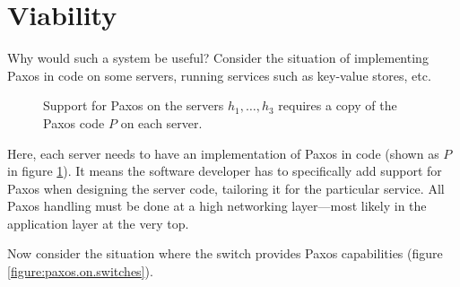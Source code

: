 \section{Viability}

Why would such a system be useful? Consider the situation of implementing
Paxos in code on some servers, running services such as key-value stores,
etc.

\begin{figure}[H]
  \centering
  \caption{Support for Paxos on the servers $h_1, \dots, h_3$ requires a
    copy of the Paxos code $P$ on each server.}
  \label{figure:paxos.on.servers}
\end{figure}

Here, each server needs to have an implementation of Paxos in code (shown as $P$
in figure \ref{figure:paxos.on.servers}).
It means the software developer has to specifically add support
for Paxos when designing the server code, tailoring it for the
particular service.  All Paxos handling must be done
at a high networking layer---most likely in the application layer at the
very top.

Now consider the situation where the switch provides Paxos capabilities
(figure \ref{figure:paxos.on.switches}).

